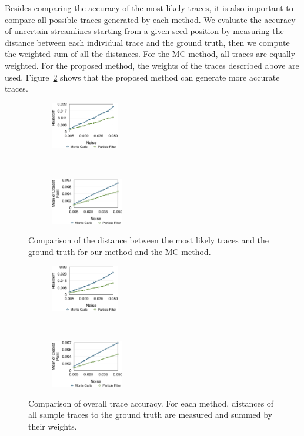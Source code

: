 Besides comparing the accuracy of the most likely traces, it is also important to compare all possible traces generated by each method. We evaluate the accuracy of uncertain streamlines starting from a given seed position by measuring the distance between each individual trace and the ground truth, then we compute the weighted sum of all the distances. For the MC method, all traces are equally weighted. For the proposed method, the weights of the traces described above are used. Figure~\ref{gerror_r} shows that the proposed method can generate more accurate traces.

\begin{figure}[!htb]
  \centering
  \begin{subfigure}[b]{0.24\textwidth}
    \centering
    \includegraphics[height=0.8in]{../figures/doublegyre_h.eps}
  \end{subfigure}~
  \begin{subfigure}[b]{0.24\textwidth}
    \centering
    \includegraphics[height=0.8in]{../figures/doublegyre_m.eps}
  \end{subfigure}
  \caption{Comparison of the distance between the most likely traces and the ground truth for our method and the MC method.}
  \label{gerror}
\end{figure}

\begin{figure}[!htb]
  \centering
  \begin{subfigure}[b]{0.24\textwidth}
    \centering
    \includegraphics[height=0.8in]{../figures/doublegyre_hr.eps}
  \end{subfigure}~
  \begin{subfigure}[b]{0.24\textwidth}
    \centering
    \includegraphics[height=0.8in]{../figures/doublegyre_mr.eps}
  \end{subfigure}
  \caption{Comparison of overall trace accuracy. For each method, distances of all sample traces to the ground truth are measured and summed by their weights.}
  \label{gerror_r}
\end{figure}

